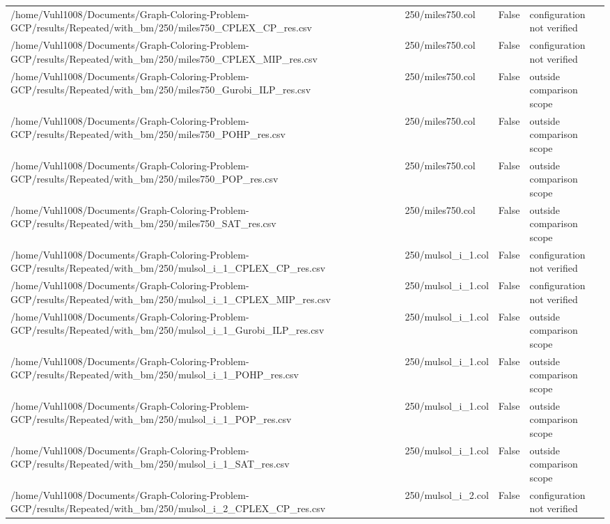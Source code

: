 \begin{table}[htbp]
\begin{tabular}{llll}
/home/Vuhl1008/Documents/Graph-Coloring-Problem-GCP/results/Repeated/with\_bm/250/miles750\_CPLEX\_CP\_res.csv & 250/miles750.col & False & configuration not verified \\
/home/Vuhl1008/Documents/Graph-Coloring-Problem-GCP/results/Repeated/with\_bm/250/miles750\_CPLEX\_MIP\_res.csv & 250/miles750.col & False & configuration not verified \\
/home/Vuhl1008/Documents/Graph-Coloring-Problem-GCP/results/Repeated/with\_bm/250/miles750\_Gurobi\_ILP\_res.csv & 250/miles750.col & False & outside comparison scope \\
/home/Vuhl1008/Documents/Graph-Coloring-Problem-GCP/results/Repeated/with\_bm/250/miles750\_POHP\_res.csv & 250/miles750.col & False & outside comparison scope \\
/home/Vuhl1008/Documents/Graph-Coloring-Problem-GCP/results/Repeated/with\_bm/250/miles750\_POP\_res.csv & 250/miles750.col & False & outside comparison scope \\
/home/Vuhl1008/Documents/Graph-Coloring-Problem-GCP/results/Repeated/with\_bm/250/miles750\_SAT\_res.csv & 250/miles750.col & False & outside comparison scope \\
/home/Vuhl1008/Documents/Graph-Coloring-Problem-GCP/results/Repeated/with\_bm/250/mulsol\_i\_1\_CPLEX\_CP\_res.csv & 250/mulsol\_i\_1.col & False & configuration not verified \\
/home/Vuhl1008/Documents/Graph-Coloring-Problem-GCP/results/Repeated/with\_bm/250/mulsol\_i\_1\_CPLEX\_MIP\_res.csv & 250/mulsol\_i\_1.col & False & configuration not verified \\
/home/Vuhl1008/Documents/Graph-Coloring-Problem-GCP/results/Repeated/with\_bm/250/mulsol\_i\_1\_Gurobi\_ILP\_res.csv & 250/mulsol\_i\_1.col & False & outside comparison scope \\
/home/Vuhl1008/Documents/Graph-Coloring-Problem-GCP/results/Repeated/with\_bm/250/mulsol\_i\_1\_POHP\_res.csv & 250/mulsol\_i\_1.col & False & outside comparison scope \\
/home/Vuhl1008/Documents/Graph-Coloring-Problem-GCP/results/Repeated/with\_bm/250/mulsol\_i\_1\_POP\_res.csv & 250/mulsol\_i\_1.col & False & outside comparison scope \\
/home/Vuhl1008/Documents/Graph-Coloring-Problem-GCP/results/Repeated/with\_bm/250/mulsol\_i\_1\_SAT\_res.csv & 250/mulsol\_i\_1.col & False & outside comparison scope \\
/home/Vuhl1008/Documents/Graph-Coloring-Problem-GCP/results/Repeated/with\_bm/250/mulsol\_i\_2\_CPLEX\_CP\_res.csv & 250/mulsol\_i\_2.col & False & configuration not verified \\

\end{tabular}
\end{table}
